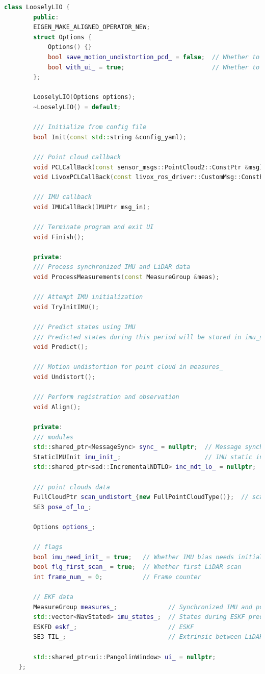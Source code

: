 \begin{lstlisting}[language=c++,caption=src/ch7/loosely_coupled_lio/loosly_lio.h]
	class LooselyLIO {
		public:
		EIGEN_MAKE_ALIGNED_OPERATOR_NEW;
		struct Options {
			Options() {}
			bool save_motion_undistortion_pcd_ = false;  // Whether to save point clouds before/after motion undistortion
			bool with_ui_ = true;                        // Whether to enable UI
		};
		
		LooselyLIO(Options options);
		~LooselyLIO() = default;
		
		/// Initialize from config file
		bool Init(const std::string &config_yaml);
		
		/// Point cloud callback
		void PCLCallBack(const sensor_msgs::PointCloud2::ConstPtr &msg);
		void LivoxPCLCallBack(const livox_ros_driver::CustomMsg::ConstPtr &msg);
		
		/// IMU callback
		void IMUCallBack(IMUPtr msg_in);
		
		/// Terminate program and exit UI
		void Finish();
		
		private:
		/// Process synchronized IMU and LiDAR data
		void ProcessMeasurements(const MeasureGroup &meas);
		
		/// Attempt IMU initialization
		void TryInitIMU();
		
		/// Predict states using IMU
		/// Predicted states during this period will be stored in imu_states_
		void Predict();
		
		/// Motion undistortion for point cloud in measures_
		void Undistort();
		
		/// Perform registration and observation
		void Align();
		
		private:
		/// modules
		std::shared_ptr<MessageSync> sync_ = nullptr;  // Message synchronizer
		StaticIMUInit imu_init_;                       // IMU static initialization
		std::shared_ptr<sad::IncrementalNDTLO> inc_ndt_lo_ = nullptr;
		
		/// point clouds data
		FullCloudPtr scan_undistort_{new FullPointCloudType()};  // scan after undistortion
		SE3 pose_of_lo_;
		
		Options options_;
		
		// flags
		bool imu_need_init_ = true;   // Whether IMU bias needs initialization
		bool flg_first_scan_ = true;  // Whether first LiDAR scan
		int frame_num_ = 0;           // Frame counter
		
		// EKF data
		MeasureGroup measures_;              // Synchronized IMU and point cloud
		std::vector<NavStated> imu_states_;  // States during ESKF prediction
		ESKFD eskf_;                         // ESKF
		SE3 TIL_;                            // Extrinsic between LiDAR and IMU
		
		std::shared_ptr<ui::PangolinWindow> ui_ = nullptr;
	};
\end{lstlisting}

